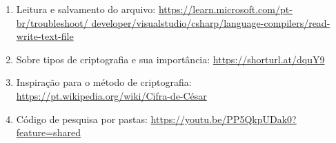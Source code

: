 \documentclass{uninove-ppgi} %
\begin{document}

\regularchapterstyle






















    \begin{enumerate}
            \item Leitura e salvamento do arquivo: \href{https://learn.microsoft.com/pt-br/troubleshoot/developer/visualstudio/csharp/language-compilers/read-write-text-file}{https://learn.microsoft.com/pt-br/troubleshoot/
            developer/visualstudio/csharp/language-compilers/read-write-text-file}

            \item Sobre tipos de criptografia e sua importância: \href{https://shorturl.at/dquY9}
            {https://shorturl.at/dquY9}

            \item Inspiração para o método de criptografia: \href{https://pt.wikipedia.org/wiki/Cifra_de_César}
            {https://pt.wikipedia.org/wiki/Cifra-de-César}

            \item Código de pesquisa por pastas: \href{https://youtu.be/PP5QkpUDak0?feature=shared }
            {https://youtu.be/PP5QkpUDak0?feature=shared}
    \end{enumerate}
\end{document}
